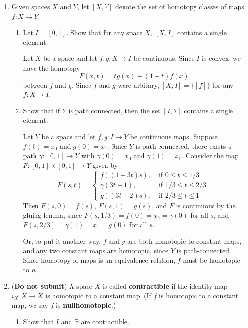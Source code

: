 \documentclass[letterpaper,12pt]{article}
\newcommand{\R}{\mathbb{R}}
\newcommand{\cla}[1]{\left[ #1\right]}
\begin{document}
\begin{enumerate}
\bigskip

\item Given spaces $X$ and $Y$, let $\cla{X,Y}$ denote the set of homotopy classes of maps $f:X\to Y$.
\begin{enumerate}
\item Let $I=[0,1]$. Show that for any space $X$, $\cla{X,I}$ contains a single element.

\bigskip

Let $X$ be a space and let $f,g:X\to I$ be continuous. Since $I$ is convex, we have the homotopy
\[
 F(x,t) = tg(x)+(1-t)f(x)
\]
between $f$ and $g$. Since $f$ and $g$ were arbitary, $\cla{X,I} = \{\cla{f}\}$ for any $f:X\to I$.

\bigskip

\item Show that if $Y$ is path connected, then the set $\cla{I,Y}$ contains a single element.

\bigskip

Let $Y$ be a space and let $f,g:I\to Y$ be continuous maps. Suppose $f(0)=x_0$ and $g(0)=x_1$. Since $Y$ is path connected, there exists a path $\gamma:[0,1]\to Y$ with $\gamma(0)=x_0$ and $\gamma(1)=x_1$. Consider the map $F:[0,1]\times [0,1]\to Y$ given by
\[
 F(s,t) = \begin{cases}
           f((1-3t)s), & \text{ if } 0\leq t\leq 1/3\\
	   \gamma(3t-1), & \text{ if } 1/3\leq t\leq 2/3\\
	   g((3t-2)s), & \text{ if } 2/3\leq t\leq 1
          \end{cases}.
\]
Then $F(s,0) = f(s)$, $F(s,1) = g(s)$, and $F$ is continuous by the gluing lemma, since $F(s,1/3) = f(0) = x_0 = \gamma(0)$ for all $s$, and $F(s,2/3) = \gamma(1) = x_1 = g(0)$ for all $s$.

Or, to put it another way, $f$ and $g$ are both homotopic to constant maps, and any two constant maps are homotopic, since $Y$ is path-connected. Since homotopy of maps is an equivalence relation, $f$ must be homotopic to $g$.

\bigskip

\end{enumerate}
\item ({\bf Do not submit}) A space $X$ is called {\bf contractible} if the identity map $i_X:X\to X$ is homotopic to a constant map. (If $f$ is homotopic to a constant map, we say $f$ is {\bf nullhomotopic}.)
\begin{enumerate}
\item Show that $I$ and $\R$ are contractible.


\end{enumerate}
\end{enumerate}
\end{document}
